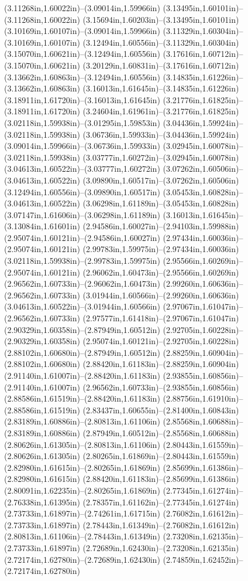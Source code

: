 (3.11268in,1.60022in)--(3.09014in,1.59966in) (3.13495in,1.60101in)--(3.11268in,1.60022in) (3.15694in,1.60203in)--(3.13495in,1.60101in) (3.10169in,1.60107in)--(3.09014in,1.59966in) (3.11329in,1.60304in)--(3.10169in,1.60107in) (3.12494in,1.60556in)--(3.11329in,1.60304in) (3.15070in,1.60621in)--(3.12494in,1.60556in) (3.17616in,1.60712in)--(3.15070in,1.60621in) (3.20129in,1.60831in)--(3.17616in,1.60712in) (3.13662in,1.60863in)--(3.12494in,1.60556in) (3.14835in,1.61226in)--(3.13662in,1.60863in) (3.16013in,1.61645in)--(3.14835in,1.61226in) (3.18911in,1.61720in)--(3.16013in,1.61645in) (3.21776in,1.61825in)--(3.18911in,1.61720in) (3.24604in,1.61961in)--(3.21776in,1.61825in) (3.02118in,1.59938in)--(3.01295in,1.59853in) (3.04436in,1.59924in)--(3.02118in,1.59938in) (3.06736in,1.59933in)--(3.04436in,1.59924in) (3.09014in,1.59966in)--(3.06736in,1.59933in) (3.02945in,1.60078in)--(3.02118in,1.59938in) (3.03777in,1.60272in)--(3.02945in,1.60078in) (3.04613in,1.60522in)--(3.03777in,1.60272in) (3.07262in,1.60506in)--(3.04613in,1.60522in) (3.09890in,1.60517in)--(3.07262in,1.60506in) (3.12494in,1.60556in)--(3.09890in,1.60517in) (3.05453in,1.60828in)--(3.04613in,1.60522in) (3.06298in,1.61189in)--(3.05453in,1.60828in) (3.07147in,1.61606in)--(3.06298in,1.61189in) (3.16013in,1.61645in)--(3.13084in,1.61601in) (2.94586in,1.60027in)--(2.94103in,1.59988in) (2.95074in,1.60121in)--(2.94586in,1.60027in) (2.97434in,1.60036in)--(2.95074in,1.60121in) (2.99783in,1.59975in)--(2.97434in,1.60036in) (3.02118in,1.59938in)--(2.99783in,1.59975in) (2.95566in,1.60269in)--(2.95074in,1.60121in) (2.96062in,1.60473in)--(2.95566in,1.60269in) (2.96562in,1.60733in)--(2.96062in,1.60473in) (2.99260in,1.60636in)--(2.96562in,1.60733in) (3.01944in,1.60566in)--(2.99260in,1.60636in) (3.04613in,1.60522in)--(3.01944in,1.60566in) (2.97067in,1.61047in)--(2.96562in,1.60733in) (2.97577in,1.61418in)--(2.97067in,1.61047in) (2.90329in,1.60358in)--(2.87949in,1.60512in) (2.92705in,1.60228in)--(2.90329in,1.60358in) (2.95074in,1.60121in)--(2.92705in,1.60228in) (2.88102in,1.60680in)--(2.87949in,1.60512in) (2.88259in,1.60904in)--(2.88102in,1.60680in) (2.88420in,1.61183in)--(2.88259in,1.60904in) (2.91140in,1.61007in)--(2.88420in,1.61183in) (2.93855in,1.60856in)--(2.91140in,1.61007in) (2.96562in,1.60733in)--(2.93855in,1.60856in) (2.88586in,1.61519in)--(2.88420in,1.61183in) (2.88756in,1.61910in)--(2.88586in,1.61519in) (2.83437in,1.60655in)--(2.81400in,1.60843in) (2.83189in,1.60886in)--(2.80813in,1.61106in) (2.85568in,1.60688in)--(2.83189in,1.60886in) (2.87949in,1.60512in)--(2.85568in,1.60688in) (2.80626in,1.61305in)--(2.80813in,1.61106in) (2.80443in,1.61559in)--(2.80626in,1.61305in) (2.80265in,1.61869in)--(2.80443in,1.61559in) (2.82980in,1.61615in)--(2.80265in,1.61869in) (2.85699in,1.61386in)--(2.82980in,1.61615in) (2.88420in,1.61183in)--(2.85699in,1.61386in) (2.80091in,1.62235in)--(2.80265in,1.61869in) (2.77345in,1.61274in)--(2.76338in,1.61395in) (2.78357in,1.61162in)--(2.77345in,1.61274in) (2.73733in,1.61897in)--(2.74261in,1.61715in) (2.76082in,1.61612in)--(2.73733in,1.61897in) (2.78443in,1.61349in)--(2.76082in,1.61612in) (2.80813in,1.61106in)--(2.78443in,1.61349in) (2.73208in,1.62135in)--(2.73733in,1.61897in) (2.72689in,1.62430in)--(2.73208in,1.62135in) (2.72174in,1.62780in)--(2.72689in,1.62430in) (2.74859in,1.62452in)--(2.72174in,1.62780in) 
